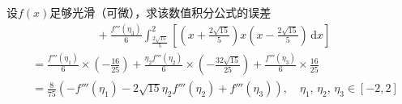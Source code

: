 \documentclass[11pt]{article}
\begin{document}
\begin{question}
\begin{subquestion}{设$f(x)$足够光滑（可微），求该数值积分公式的误差}
{\begin{align*}
                       & \phantom{1+1+1+1} + \frac{f'''(\eta_3)}{6}\int_{\frac{2\sqrt{15}}{5}}^{2}\!{\left[\left(x + \frac{2\sqrt{15}}{5}\right)x\left(x - \frac{2\sqrt{15}}{5}\right)\,\text{d}x\right]}                                                                                                         \\
                       & = \frac{f'''(\eta_1)}{6} \times \left(- \frac{16}{25}\right) + \frac{\eta_2f'''(\eta_2)}{6} \times \left(-\frac{32\sqrt{15}}{25}\right) + \frac{f'''(\eta_3)}{6} \times \frac{16}{25}                                                                                                    \\
                       & = \frac{8}{75}\left(- f'''(\eta_1) - 2\sqrt{15}\eta_2f'''(\eta_2) + f'''(\eta_3) \right),\quad \eta_1,\, \eta_2,\, \eta_3 \in [-2, 2]
            \end{align*}
        }
    \end{subquestion}
\end{question}
\end{document}
